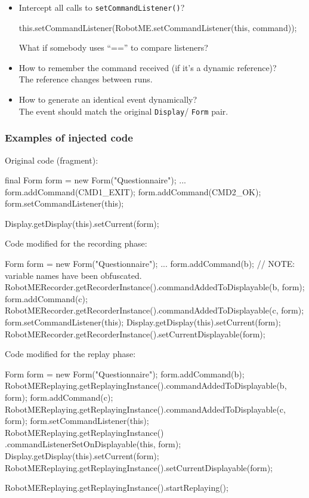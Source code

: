 \documentclass[compress]{beamer}
\begin{document}
\begin{frame}[fragile]
    \begin{itemize}
        \item Intercept all calls to \texttt{setCommandListener()}?
        \begin{javablock}
this.setCommandListener(RobotME.setCommandListener(this, command));
        \end{javablock}
        {\tiny What if somebody uses ``=='' to compare listeners?}

        \pause
        \item How to remember the command received (if it's a dynamic reference)?\\
        {\tiny The reference changes between runs.}

        \pause
        \item How to generate an identical event dynamically?\\
        {\tiny The event should match the original \texttt{Display}/ \texttt{Form} pair.}
    \end{itemize}
\end{frame}

\begin{frame}[fragile]
    \frametitle{Examples of injected code}

    Original code (fragment):
    \begin{javablock}
final Form form = new Form("Questionnaire");
...
form.addCommand(CMD1_EXIT);
form.addCommand(CMD2_OK);
form.setCommandListener(this);

Display.getDisplay(this).setCurrent(form);
    \end{javablock}
\end{frame}

\begin{frame}
    Code modified for the recording phase:
    \begin{javablock}
Form form = new Form("Questionnaire");
...
form.addCommand(b); // NOTE: variable names have been obfuscated.
RobotMERecorder.getRecorderInstance().commandAddedToDisplayable(b, form);
form.addCommand(c);
RobotMERecorder.getRecorderInstance().commandAddedToDisplayable(c, form);
form.setCommandListener(this);
Display.getDisplay(this).setCurrent(form);
RobotMERecorder.getRecorderInstance().setCurrentDisplayable(form);
    \end{javablock}
    
    \medskip
    Code modified for the replay phase:
    \begin{javablock}
Form form = new Form("Questionnaire");
form.addCommand(b);
RobotMEReplaying.getReplayingInstance().commandAddedToDisplayable(b, form);
form.addCommand(c);
RobotMEReplaying.getReplayingInstance().commandAddedToDisplayable(c, form);
form.setCommandListener(this);
RobotMEReplaying.getReplayingInstance()
    .commandListenerSetOnDisplayable(this, form);
Display.getDisplay(this).setCurrent(form);
RobotMEReplaying.getReplayingInstance().setCurrentDisplayable(form);

RobotMEReplaying.getReplayingInstance().startReplaying();    
    \end{javablock}
\end{frame}
\end{document}
